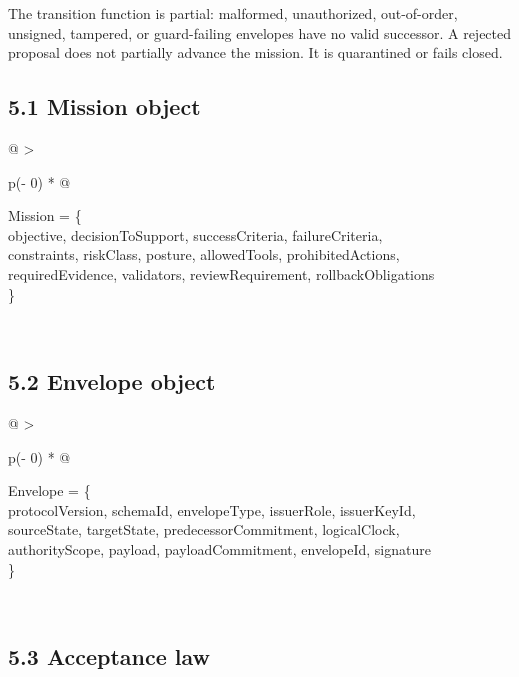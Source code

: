 The transition function is partial: malformed, unauthorized,
out-of-order, unsigned, tampered, or guard-failing envelopes have no
valid successor. A rejected proposal does not partially advance the
mission. It is quarantined or fails closed.

\subsection{5.1 Mission object}\label{mission-object}

\begin{longtable}[]{@{}
  >{\raggedright\arraybackslash}p{(\columnwidth - 0\tabcolsep) * }@{}}
\toprule\noalign{}
\begin{minipage}[b]{\linewidth}\raggedright
Mission = \{\\
objective, decisionToSupport, successCriteria, failureCriteria,\\
constraints, riskClass, posture, allowedTools, prohibitedActions,\\
requiredEvidence, validators, reviewRequirement, rollbackObligations\\
\}\strut
\end{minipage} \\
\midrule\noalign{}
\endhead
\bottomrule\noalign{}
\endlastfoot
\end{longtable}

\subsection{5.2 Envelope object}\label{envelope-object}

\begin{longtable}[]{@{}
  >{\raggedright\arraybackslash}p{(\columnwidth - 0\tabcolsep) * }@{}}
\toprule\noalign{}
\begin{minipage}[b]{\linewidth}\raggedright
Envelope = \{\\
protocolVersion, schemaId, envelopeType, issuerRole, issuerKeyId,\\
sourceState, targetState, predecessorCommitment, logicalClock,\\
authorityScope, payload, payloadCommitment, envelopeId, signature\\
\}\strut
\end{minipage} \\
\midrule\noalign{}
\endhead
\bottomrule\noalign{}
\endlastfoot
\end{longtable}

\subsection{5.3 Acceptance law}\label{acceptance-law}

